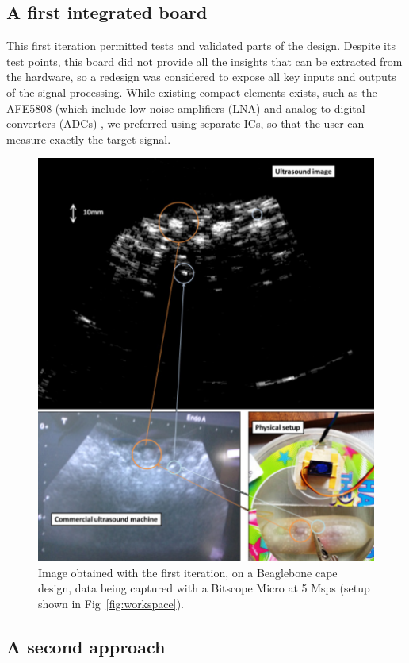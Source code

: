 \documentclass[letterpaper, 10 pt, conference]{ieeeconf} %
\begin{document}
\subsection{A first integrated board}

This first iteration permitted tests and validated parts of the design. Despite its test points, this board did not provide all the insights that can be extracted from the hardware, so a redesign was considered to expose all key inputs and outputs of the signal processing. While existing compact elements exists, such as the AFE5808 (which include low noise amplifiers (LNA) and analog-to-digital converters (ADCs) \cite{c8}, we preferred using separate ICs, so that the user can measure exactly the target signal.

\begin{figure}%
\centering
\includegraphics[width=.95\linewidth]{3in1}
\caption{Image obtained with the first iteration, on a Beaglebone cape design, data being captured with a Bitscope Micro at 5 Msps (setup shown in Fig~\ref{fig:workspace}).}
\label{fig:single}
\end{figure}

\subsection{A second approach}
\end{document}
